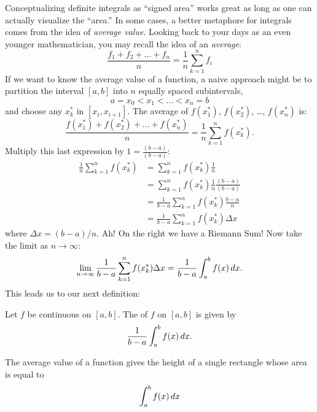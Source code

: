 \documentclass{ximera}
\begin{document}
Conceptualizing definite integrals as ``signed area'' works great as
long as one can actually visualize the ``area.'' In some cases, a
better metaphore for integrals comes from the idea of \textit{average
  value}.  Looking back to your days as an even younger mathematician,
you may recall the idea of an \textit{average}:
\[
\frac{f_1+f_2+\dots+f_n}{n} = \frac{1}{n}\sum_{k=1}^n f_i
\]
If we want to know the average value of a function, a naive approach
might be to partition the interval $[a,b]$ into $n$ equally spaced
subintervals, 
\[
a=x_0 < x_1 < \dots < x_{n}=b
\]
and choose any $x_k^*$ in $[x_i,x_{i+1}]$. The average of $f(x_1^*)$,
$f(x_2^*)$, \dots, $f(x_n^*)$ is:
\[
\frac{f(x_1^*) + f(x_2^*) + \dots + f(x_n^*)}{n} = \frac1n\sum_{k=1}^n f(x_k^*).
\]
Multiply this last expression by $1 = \frac{(b-a)}{(b-a)}$:
\begin{align*}
  \frac1n\sum_{k=1}^n f(x_k^*) &= \sum_{k=1}^n f(x_k^*)\frac1n \\
  &= \sum_{k=1}^n f(x_k^*)\frac1n \frac{(b-a)}{(b-a)} \\
  &= \frac{1}{b-a} \sum_{k=1}^n f(x_k^*)\frac{b-a}n  \\
  &=\frac{1}{b-a} \sum_{k=1}^n f(x_k^*)\Delta x
\end{align*}
where $\Delta x = (b-a)/n$.  Ah! On the right we have a Riemann Sum!
Now take the limit as $n\to\infty$:
\[
\lim_{n\to\infty} \frac{1}{b-a} \sum_{k=1}^n f(x_k^*)\Delta x = \frac{1}{b-a} \int_a^b f(x)\,d x.
\]
This leads us to our next definition:

\begin{definition}
  Let $f$ be continuous on $[a,b]$. The  of $f$ on
  $[a,b]$ is given by
  \[
  \frac{1}{b-a}\int_a^b f(x)\,d x.
  \]
\end{definition}

The average value of a function gives the height of a single rectangle whose area is equal to
\[
\int_a^b f(x) \,d x
\]
\begin{image}
\end{image}
\end{document}
